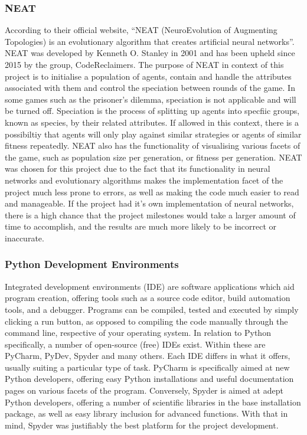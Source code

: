 \documentclass[12pt,a4paper]{article}
\begin{document}
\subsubsection{NEAT}
According to their official website, “NEAT (NeuroEvolution of Augmenting Topologies) is an evolutionary algorithm that creates artificial neural networks”. NEAT was developed by Kenneth O. Stanley in 2001 and has been upheld since 2015 by the group, CodeReclaimers. The purpose of NEAT in context of this project is to initialise a population of agents, contain and handle the attributes associated with them and control the speciation between rounds of the game. In some games such as the prisoner's dilemma, speciation is not applicable and will be turned off. Speciation is the process of splitting up agents into specfiic groups, known as species, by their related attributes. If allowed in this context, there is a possibiltiy that agents will only play against similar strategies or agents of similar fitness repeatedly. NEAT also has the functionality of visualising various facets of the game, such as population size per generation, or fitness per generation. NEAT was chosen for this project due to the fact that its functionality in neural networks and evolutionary algorithms makes the implementation facet of the project much less prone to errors, as well as making the code much easier to read and manageable. If the project had it's own implementation of neural networks, there is a high chance that the project milestones would take a larger amount of time to accomplish, and the results are much more likely to be incorrect or inaccurate.

\subsubsection{Python Development Environments}
Integrated development environments (IDE) are software applications which aid program creation, offering tools such as a source code editor, build automation tools, and a debugger. Programs can be compiled, tested and executed by simply clicking a run button, as opposed to compiling the code manually through the command line, respective of your operating system. In relation to Python specifically, a number of open-source (free) IDEs exist. Within these are PyCharm, PyDev, Spyder and many others. Each IDE differs in what it offers, usually suiting a particular type of task. PyCharm is specifically aimed at new Python developers, offering easy Python installations and useful documentation pages on various facets of the program. Conversely, Spyder is aimed at adept Python developers, offering a number of scientific libraries in the base installation package, as well as easy library inclusion for advanced functions. With that in mind, Spyder was justifiably the best platform for the project development. \\
\end{document}
